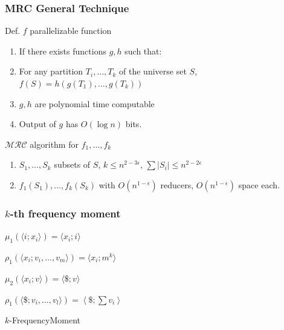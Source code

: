\documentclass[12pt,aspectratio=169]{beamer}
\begin{document}
\begin{frame}\frametitle{MRC General Technique}
  \begin{block}{Def. $f$ parallelizable function}
    \begin{enumerate}
    \item
      If there exists functions $g, h$ such that:
    \item
      For any partition $T_{i}, \ldots , T_{k}$ of the universe set $S$, $f(S)
      = h(g(T_{1}), \ldots , g(T_{k}))$
    \item
      $g, h$ are polynomial time computable
    \item
      Output of $g$ has $O(\log n)$ bits.
    \end{enumerate}
  \end{block}

  \begin{block}{$\mathcal{MRC}$ algorithm for $f_{1}, \ldots, f_{k}$}
    \begin{enumerate}
    \item
      $S_{1}, \ldots , S_{k}$ subsets of $S$, $k\le n^{2-3\epsilon}$, $\sum
      |S_{i}|\le n^{2-2\epsilon}$
    \item
      $f_{1}(S_{1}), \ldots , f_{k}(S_{k})$ with $O(n^{1-\epsilon})$ reducers,
      $O(n^{1-\epsilon})$ space each.
    \end{enumerate}
  \end{block}
\end{frame}

\begin{frame}\frametitle{$k$-th frequency moment}
\begin{algorithm}[H]

$\mu_{1}(\langle i; x_{i} \rangle) = \langle x_{i}; i \rangle$\;

$\rho_{1}  (\langle x_{i} ; {v_{i} , \ldots , v_{m}} \rangle) = \langle x_{i} ;
m^{k}\rangle$\;

$\mu_{2}(\langle x_{i} ; v \rangle) = \langle \$ ; v \rangle$\;

$\rho_{1}  (\langle \$ ; {v_{i} , \ldots , v_{l}} \rangle) = \left\langle \$
; \sum v_{i} \right\rangle $\;
\caption{$k$-FrequencyMoment}
\end{algorithm}
\end{frame}
\end{document}
